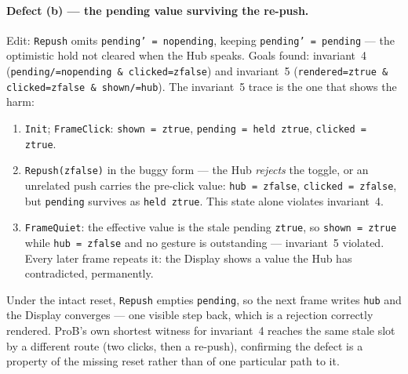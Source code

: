 \documentclass[a4paper,10pt,fleqn]{article}
\begin{document}
\paragraph{Defect (b) --- the pending value surviving the re-push.}
Edit: \texttt{Repush} omits \texttt{pending' = nopending}, keeping
\texttt{pending' = pending} --- the optimistic hold not cleared when the Hub
speaks.  Goals found: invariant~4 (\texttt{pending/=nopending \&
clicked=zfalse}) and invariant~5 (\texttt{rendered=ztrue \& clicked=zfalse \&
shown/=hub}).  The invariant~5 trace is the one that shows the harm:
\begin{enumerate}
  \item \texttt{Init}; \texttt{FrameClick}: \texttt{shown = ztrue},
    \texttt{pending = held~ztrue}, \texttt{clicked = ztrue}.
  \item \texttt{Repush(zfalse)} in the buggy form --- the Hub \emph{rejects}
    the toggle, or an unrelated push carries the pre-click value:
    \texttt{hub = zfalse}, \texttt{clicked = zfalse}, but \texttt{pending}
    survives as \texttt{held~ztrue}.  This state alone violates invariant~4.
  \item \texttt{FrameQuiet}: the effective value is the stale
    pending \texttt{ztrue}, so \texttt{shown = ztrue} while
    \texttt{hub = zfalse} and no gesture is outstanding --- invariant~5
    violated.  Every later frame repeats it: the Display shows a value the Hub
    has contradicted, permanently.
\end{enumerate}
Under the intact reset, \texttt{Repush} empties \texttt{pending}, so the next
frame writes \texttt{hub} and the Display converges --- one visible step back,
which is a rejection correctly rendered.  ProB's own shortest witness for
invariant~4 reaches the same stale slot by a different route (two clicks, then
a re-push), confirming the defect is a property of the missing reset rather
than of one particular path to it.
\end{document}
